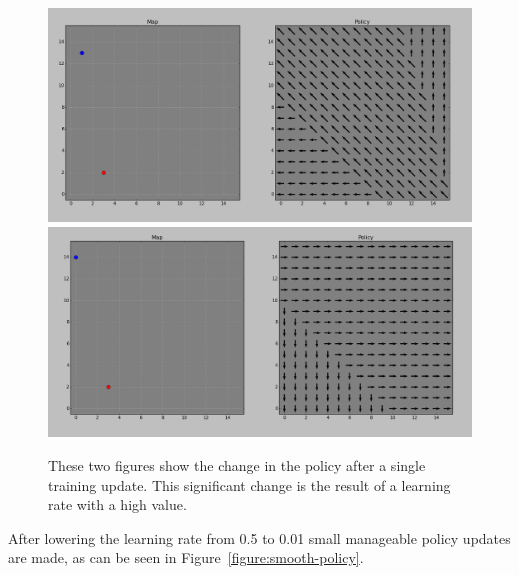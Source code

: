 \begin{figure}
	\centering
	\label{figure:erratic-policy}
	\includegraphics[width=0.9\linewidth]{../images/before_policyJump.png}
	\includegraphics[width=0.9\linewidth]{../images/after_policyJump.png}
	\caption{These two figures show the change in the policy after a single training update. 
	This significant change is the result of a learning rate with a high value.}
\end{figure}

After lowering the learning rate from 0.5 to 0.01 small manageable policy updates are made, as can be seen in Figure~\ref{figure:smooth-policy}.

